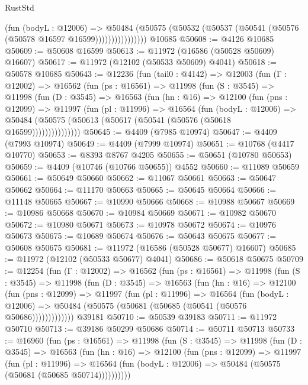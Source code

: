 \begin{lexlean}{RustStd}
\begin{coremodule}
                      (fun (bodyL : @12006) =>
                      @50484
                        (@50575
                          (@50532 (@50537 (@50541 (@50576 (@50578 @16597 @16599))))))))))))))))
    @10685
@50608 := @4126 @10685
@50609 := @50608 @16599
@50613 := @11972 (@16586 (@50528 @50609) @16607)
@50617 := @11972 (@12102 (@50533 @50609) @4041)
@50618 := @50578 @10685
@50643 := @12236
    (fun (tail0 : @4142) =>
    @12003
      (fun (Γ : @12002) =>
      @16562
        (fun (ps : @16561) =>
        @11998
          (fun (S : @3545) =>
          @11998
            (fun (D : @3545) =>
            @16563
              (fun (hn : @16) =>
              @12100
                (fun (pns : @12099) =>
                @11997
                  (fun (pl : @11996) =>
                  @16564
                    (fun (bodyL : @12006) =>
                    @50484 (@50575 (@50613 (@50617 (@50541 (@50576 (@50618 @16599)))))))))))))))
@50645 := @4409 (@7985 @10974)
@50647 := @4409 (@7993 @10974)
@50649 := @4409 (@7999 @10974)
@50651 := @10768 (@4417 @10770)
@50653 := @8393 @8767 @4205
@50655 := @50651 (@10780 @50653)
@50659 := @4409 (@10746 (@10766 @50655)) @4552
@50660 := @11089 @50659
@50661 := @50649 @50660
@50662 := @11067 @50661
@50663 := @50647 @50662
@50664 := @11170 @50663
@50665 := @50645 @50664
@50666 := @11148 @50665
@50667 := @10990 @50666
@50668 := @10988 @50667
@50669 := @10986 @50668
@50670 := @10984 @50669
@50671 := @10982 @50670
@50672 := @10980 @50671
@50673 := @10978 @50672
@50674 := @10976 @50673
@50675 := @10689 @50674
@50676 := @50643 @50675
@50677 := @50608 @50675
@50681 := @11972 (@16586 (@50528 @50677) @16607)
@50685 := @11972 (@12102 (@50533 @50677) @4041)
@50686 := @50618 @50675
@50709 := @12254
    (fun (Γ : @12002) =>
    @16562
      (fun (ps : @16561) =>
      @11998
        (fun (S : @3545) =>
        @11998
          (fun (D : @3545) =>
          @16563
            (fun (hn : @16) =>
            @12100
              (fun (pns : @12099) =>
              @11997
                (fun (pl : @11996) =>
                @16564
                  (fun (bodyL : @12006) =>
                  @50484 (@50575 (@50681 (@50685 (@50541 (@50576 @50686)))))))))))))
    @39181
@50710 := @50539 @39183
@50711 := @11972 @50710
@50713 := @39186 @50299 @50686
@50714 := @50711 @50713
@50733 := @16960
    (fun (ps : @16561) =>
    @11998
      (fun (S : @3545) =>
      @11998
        (fun (D : @3545) =>
        @16563
          (fun (hn : @16) =>
          @12100
            (fun (pns : @12099) =>
            @11997
              (fun (pl : @11996) =>
              @16564 (fun (bodyL : @12006) => @50484 (@50575 (@50681 (@50685 @50714))))))))))

\end{coremodule}
\end{lexlean}
